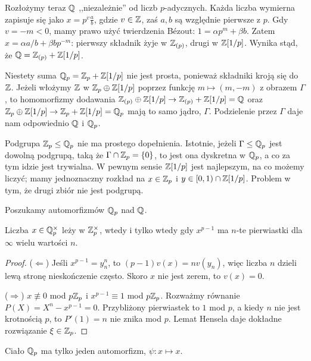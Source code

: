 Rozłożymy teraz $\mathbb Q$ ,,niezależnie'' od liczb $p$-adycznych.
Każda liczba wymierna zapisuje się jako $x = p^v \frac a b$, gdzie $v \in \mathbb Z$, zaś $a, b$ są względnie pierwsze z $p$.
Gdy $v = -m < 0$, mamy prawo użyć twierdzenia Bézout: $1 = \alpha p^m + \beta b$.
Zatem $x = \alpha a / b + \beta b p^{-m}$: pierwszy składnik żyje w $\mathbb Z_{(p)}$, drugi w $\mathbb Z[1/p]$.
Wynika stąd, że $\mathbb Q = \mathbb Z_{(p)} + \mathbb Z[1/p]$.

Niestety suma $\mathbb Q_p = \mathbb Z_p + \mathbb Z[1/p]$ nie jest prosta, ponieważ składniki kroją się do $\mathbb Z$.
Jeżeli włożymy $\mathbb Z$ w $\mathbb Z_p \oplus \mathbb Z[1/p]$ poprzez funkcję $m \mapsto (m, -m)$ z obrazem $\Gamma$, to homomorfizmy dodawania 
$\mathbb Z_{(p)} \oplus \mathbb Z[1/p] \to \mathbb Z_{(p)} + \mathbb Z[1/p] = \mathbb Q$ oraz $\mathbb Z_p \oplus \mathbb Z[1/p] \to \mathbb Z_p + \mathbb Z[1/p] = \mathbb Q_p$ mają to samo jądro, $\Gamma$.
Podzielenie przez $\Gamma$ daje nam odpowiednio $\mathbb Q$ i $\mathbb Q_p$.


Podgrupa $\mathbb Z_p \le \mathbb Q_p$ nie ma prostego dopełnienia.
Istotnie, jeżeli $\Gamma \le \mathbb Q_p$ jest dowolną podgrupą, taką że $\Gamma \cap \mathbb Z_p = \{0\}$, to jest ona dyskretna w $\mathbb Q_p$, a co za tym idzie jest trywialna.
W pewnym sensie $\mathbb Z[1/p]$ jest najlepszym, na co możemy liczyć; mamy jednoznaczny rozkład na $x \in \mathbb Z_p$ i $y \in [0,1) \cap \mathbb Z[1/p]$.
Problem w tym, że drugi zbiór nie jest podgrupą.

Poszukamy automorfizmów $\mathbb Q_p$ nad $\mathbb Q$.

\begin{lemat}
	Liczba $x \in \mathbb Q_p^\times$ leży w $\mathbb Z_p^\times$, wtedy i tylko wtedy gdy $x^{p-1}$ ma $n$-te pierwiastki dla $\infty$ wielu wartości $n$.
\end{lemat}

\begin{proof}
	($\Leftarrow$) Jeśli $x^{p-1} = y_n^n$, to $(p-1)v(x) = n v(y_n)$, więc liczba $n$ dzieli lewą stronę nieskończenie często.
	Skoro $x$ nie jest zerem, to $v(x) = 0$.

	($\Rightarrow$)
	$x \not \equiv 0$ mod $p\mathbb Z_p$ i $x^{p-1} \equiv 1$ mod $p \mathbb Z_p$.
	Rozważmy równanie $P(X) = X^n-x^{p-1} = 0$.
	Przybliżony pierwiastek to $1$ mod $p$, a kiedy $n$ nie jest krotnością $p$, to $P'(1) = n$ nie znika mod $p$.
	Lemat Hensela daje dokładne rozwiązanie $\xi \in \mathbb Z_p$.
\end{proof}

\begin{fakt}
	Ciało $\mathbb Q_p$ ma tylko jeden automorfizm, $\psi \colon x \mapsto x$.
\end{fakt}

